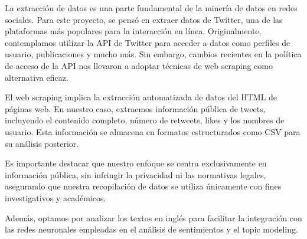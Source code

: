 \documentclass[
  letterpaper,
  DIV=11,
  numbers=noendperiod]{scrartcl}
\begin{document}
La extracción de datos es una parte fundamental de la minería de datos
en redes sociales. Para este proyecto, se pensó en extraer datos de
Twitter, una de las plataformas más populares para la interacción en
línea. Originalmente, contemplamos utilizar la API de Twitter para
acceder a datos como perfiles de usuario, publicaciones y mucho más. Sin
embargo, cambios recientes en la política de acceso de la API nos
llevaron a adoptar técnicas de web scraping como alternativa eficaz.

El web scraping implica la extracción automatizada de datos del HTML de
páginas web. En nuestro caso, extraemos información pública de tweets,
incluyendo el contenido completo, número de retweets, likes y los
nombres de usuario. Esta información se almacena en formatos
estructurados como CSV para su análisis posterior.

Es importante destacar que nuestro enfoque se centra exclusivamente en
información pública, sin infringir la privacidad ni las normativas
legales, asegurando que nuestra recopilación de datos se utiliza
únicamente con fines investigativos y académicos.

Además, optamos por analizar los textos en inglés para facilitar la
integración con las redes neuronales empleadas en el análisis de
sentimientos y el topic modeling.
\end{document}
